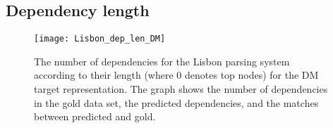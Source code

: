 



\subsection{Dependency length}

\begin{figure}[h]
    \centering
    \begin{minipage}{0.8\textwidth}
        \centering
        \texttt{[image: Lisbon\_dep\_len\_DM]}
    \end{minipage}\hfill
    \caption{The number of dependencies for the Lisbon parsing system according to their length (where 0 denotes top nodes) for the DM target representation. The graph shows the number of dependencies in the gold data set, the predicted dependencies, and the matches between predicted and gold.}
    \label{fig:Lisbon_dep_len_DM}
\end{figure}


